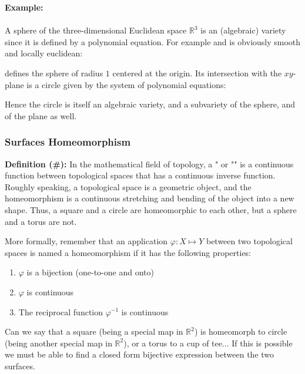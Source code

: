 	\begin{tcolorbox}[colframe=black,colback=white,sharp corners]
	\textbf{{\Large {}}Example:}\\\\
	A sphere of the three-dimensional Euclidean space $\mathbb{R}^3$ is an (algebraic) variety since it is defined by a polynomial equation. For example and is obviously smooth and locally euclidean:
	
	defines the sphere of radius $1$ centered at the origin. Its intersection with the $xy$-plane is a circle given by the system of polynomial equations:
	
	Hence the circle is itself an algebraic variety, and a subvariety of the sphere, and of the plane as well.
	\end{tcolorbox}
	

	\pagebreak
	\subsubsection{Surfaces Homeomorphism}
	\textbf{Definition (\#\mydef):} In the mathematical field of topology, a " or "" is a continuous function between topological spaces that has a continuous inverse function. Roughly speaking, a topological space is a geometric object, and the homeomorphism is a continuous stretching and bending of the object into a new shape. Thus, a square and a circle are homeomorphic to each other, but a sphere and a torus are not. 
	
	More formally, remember that an application $\varphi: X \mapsto Y$ between two topological spaces is named a homeomorphism if it has the following properties:
	\begin{enumerate}
		\item $\varphi$ is a bijection (one-to-one and onto)
		
		\item $\varphi$ is continuous
		
		\item The reciprocal function $\varphi^{-1}$ is continuous 
	\end{enumerate}
	
	Can we say that a square (being a special map in $\mathbb{R}^2$) is homeomorph to circle (being another special map in $\mathbb{R}^2$), or a torus to a cup of tee... If this is possible we must be able to find a closed form bijective expression between the two surfaces.
	
